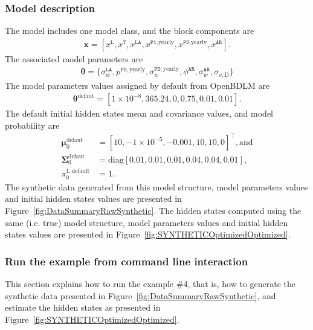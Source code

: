 \subsubsection{Model description}
The model includes one model class, and the block components are 
\begin{gather*}
\textbf{x}=[x^{\mathtt{L}}, x^{\mathtt{T}}, x^{\mathtt{LA}}, x^{\mathtt{P1}\text{,yearly}}, x^{\mathtt{P2}\text{,yearly}}, x^{\mathtt{AR}}].
\end{gather*}
The associated model parameters are
\begin{gather*}
\bm\theta=\{\sigma_{w}^{\mathtt{LA}}, p^{\mathtt{PD}, \text{yearly}}, \sigma_{w}^{\mathtt{PD}, \text{yearly}}, \phi^{\mathtt{AR}}, \sigma_{w}^{\mathtt{AR}}, \sigma_{v,\text{D}}\} 
 \end{gather*}
The model parameters values assigned by default from OpenBDLM are
\begin{gather*}
\bm\theta^{\text{defaut}}=[ 1\times10^{-8}, 365.24, 0, 0.75, 0.01, 0.01].
\end{gather*}
The default initial hidden states mean and covariance values, and model probability are 
\begin{align*}
\bm \mu^{\text{defaut}}_{0} & = [	 10  , -1\times10^{-5}  ,	-0.001	,	10  ,  	10    ,	0  ]^{\intercal}, \text{and} \\
\bm\Sigma^{\text{defaut}}_{0} & = \text{diag}[ 0.01  ,	0.01  ,	0.01  	,0.04  ,	0.04  ,	0.01 ], \\
 \pi_{0}^{1,\text{default}} & = 1.
 \end{align*}
The synthetic data generated from this model structure, model parameters values and initial hidden states values are presented in Figure~\ref{fig:DataSummaryRawSynthetic}.
The hidden states computed using the same (i.e. true) model structure, model parameters values and initial hidden states values are presented in Figure~\ref{fig:SYNTHETICOptimizedOptimized}.

\subsubsection{Run the example from command line interaction}

This section explains how to run the example \#4, that is, how to generate the synthetic data presented in Figure~\ref{fig:DataSummaryRawSynthetic}, and estimate the hidden states as presented in Figure~\ref{fig:SYNTHETICOptimizedOptimized}.


